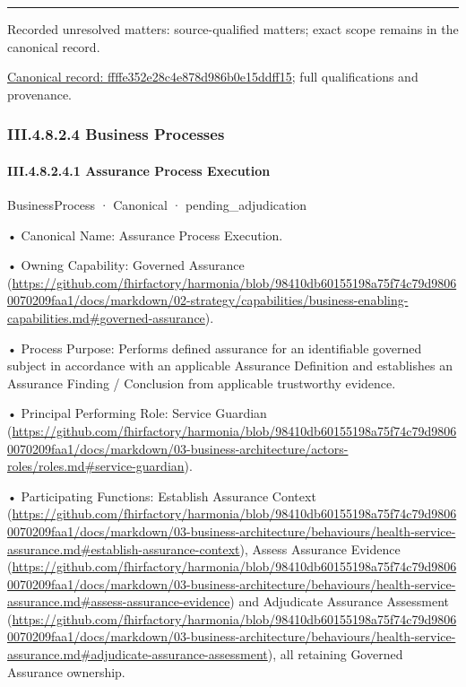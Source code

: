 \medskip\hrule\medskip

{\small Recorded unresolved matters: source-qualified matters; exact scope remains in the canonical record.}\par
{\footnotesize \href{../../../../../../../../continuum/business/business-function/ffffe352e28c4e878d986b0e15ddff15.md}{Canonical record: ffffe352e28c4e878d986b0e15ddff15}; full qualifications and provenance.}\par
\subsubsection*{III.4.8.2.4 Business Processes}
\label{navigation:III.4.8.2.4}

\paragraph*{III.4.8.2.4.1 Assurance Process Execution}
\label{navigation:III.4.8.2.4.1}

\label{element:3c67e57403b041bb8ccdaf3980b6ff94}
{\small BusinessProcess · Canonical · pending\_adjudication}\par

•
Canonical Name: Assurance Process Execution.



•
Owning Capability: Governed Assurance (\url{https://github.com/fhirfactory/harmonia/blob/98410db60155198a75f74c79d98060070209faa1/docs/markdown/02-strategy/capabilities/business-enabling-capabilities.md#governed-assurance}).



•
Process Purpose: Performs defined assurance for an identifiable governed subject in accordance with an applicable Assurance Definition and establishes an Assurance Finding / Conclusion from applicable trustworthy evidence.



•
Principal Performing Role: Service Guardian (\url{https://github.com/fhirfactory/harmonia/blob/98410db60155198a75f74c79d98060070209faa1/docs/markdown/03-business-architecture/actors-roles/roles.md#service-guardian}).



•
Participating Functions: Establish Assurance Context (\url{https://github.com/fhirfactory/harmonia/blob/98410db60155198a75f74c79d98060070209faa1/docs/markdown/03-business-architecture/behaviours/health-service-assurance.md#establish-assurance-context}), Assess Assurance Evidence (\url{https://github.com/fhirfactory/harmonia/blob/98410db60155198a75f74c79d98060070209faa1/docs/markdown/03-business-architecture/behaviours/health-service-assurance.md#assess-assurance-evidence}) and Adjudicate Assurance Assessment (\url{https://github.com/fhirfactory/harmonia/blob/98410db60155198a75f74c79d98060070209faa1/docs/markdown/03-business-architecture/behaviours/health-service-assurance.md#adjudicate-assurance-assessment}), all retaining Governed Assurance ownership.



